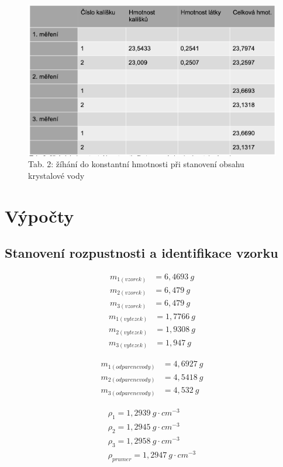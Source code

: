 \documentclass[13pt, a4paper, twoside]{article}
\begin{document}
\begin{figure}[H]
    \centering
    \includegraphics[width=6.8in]{tab_uloha10_3.png}
    \caption*{Tab. 2: žíhání do konstantní hmotnosti při stanovení obsahu krystalové vody}
\end{figure}

\section*{Výpočty}
\subsection*{Stanovení rozpustnosti a identifikace vzorku}
\begin{align*}
    m_{1(vzorek)}&=6,4693\: g\\
    m_{2(vzorek)}&= 6,479\: g\\
    m_{3(vzorek)}&= 6,479\: g
\end{align*}
\newpage
\begin{align*}
    m_{1(vytezek)}&= 1,7766\: g\\
    m_{2(vytezek)}&= 1,9308\: g\\
    m_{3(vytezek)}&= 1,947\: g
\end{align*}

\begin{align*}
    m_{1(odparenevody)}&= 4,6927\: g\\
    m_{2(odparenevody)}&= 4,5418\: g\\
    m_{3(odparenevody)}&= 4,532\: g
\end{align*}


\begin{align*}
    \rho_1 = 1,2939\: g\cdot cm^{-3}\\
    \rho_2 = 1,2945\: g\cdot cm^{-3}\\
    \rho_3 = 1,2958\: g\cdot cm^{-3}\\
    \rho_{prumer} = 1,2947\: g\cdot cm^{-3}
\end{align*}
\end{document}
